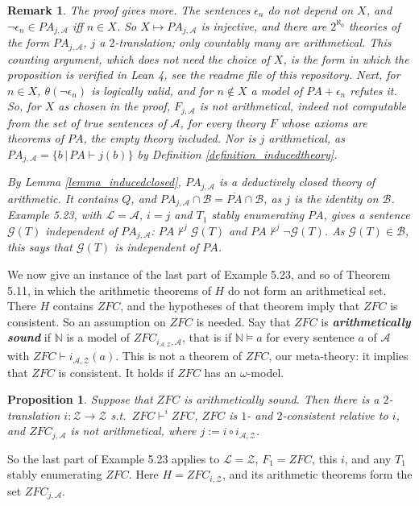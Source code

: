 \documentclass{amsart}  %
\numberwithin{equation}{section}
\newtheorem{proposition}[equation]{Proposition}
\newtheorem{remark}[equation]{Remark}
\theoremstyle{definition}
\theoremstyle{remark}
\begin{document}
\begin{remark} \label{remark_undefinable}
The proof gives more. The sentences $\epsilon _{n}$ do not depend on $X$, and $\neg \epsilon _{n} \in PA _{j, \mathcal{A}}$ iff $n \in X$. So $X \mapsto PA _{j, \mathcal{A}}$ is injective, and there are $2 ^{\aleph _{0}}$ theories of the form $PA _{j, \mathcal{A}}$, $j$ a $2$-translation; only countably many are arithmetical. This counting argument, which does not need the choice of $X$, is the form in which the proposition is verified in Lean 4, see the readme file of this repository. Next, for $n \in X$, $\theta (\neg \epsilon _{n})$ is logically valid, and for $n \notin X$ a model of $PA + \epsilon _{n}$ refutes it. So, for $X$ as chosen in the proof, $F _{j, \mathcal{A}}$ is not arithmetical, indeed not computable from the set of true sentences of $\mathcal{A}$, for every theory $F$ whose axioms are theorems of $PA$, the empty theory included. Nor is $j$ arithmetical, as $PA _{j, \mathcal{A}} = \{b \,|\, PA \vdash j (b)\}$ by Definition \ref{definition_inducedtheory}.

By Lemma \ref{lemma_inducedclosed}, $PA _{j, \mathcal{A}}$ is a deductively closed theory of arithmetic. It contains $Q$, and $PA _{j, \mathcal{A}} \cap \mathcal{B} = \overline{PA} \cap \mathcal{B}$, as $j$ is the identity on $\mathcal{B}$. Example 5.23, with $\mathcal{L} = \mathcal{A}$, $i = j$ and $T _{1}$ stably enumerating $PA$, gives a sentence $\mathcal{G} (T)$ independent of $PA _{j, \mathcal{A}}$: $PA \nvdash ^{j} \mathcal{G} (T)$ and $PA \nvdash ^{j} \neg \mathcal{G} (T)$. As $\mathcal{G} (T) \in \mathcal{B}$, this says that $\mathcal{G} (T)$ is independent of $PA$.
\end{remark}
We now give an instance of the last part of Example 5.23, and so of Theorem 5.11, in which the arithmetic theorems of $H$ do not form an arithmetical set. There $H$ contains $ZFC$, and the hypotheses of that theorem imply that $ZFC$ is consistent. So an assumption on $ZFC$ is needed. Say that $ZFC$ is \textbf{\emph{arithmetically sound}} if $\mathbb{N}$ is a model of $ZFC _{i _{\mathcal{A}, \mathcal{Z}}, \mathcal{A}}$, that is if $\mathbb{N} \models a$ for every sentence $a$ of $\mathcal{A}$ with $ZFC \vdash i _{\mathcal{A}, \mathcal{Z}} (a)$. This is not a theorem of $ZFC$, our meta-theory: it implies that $ZFC$ is consistent. It holds if $ZFC$ has an $\omega$-model.
\begin{proposition} \label{proposition_undefinableZFC}
Suppose that $ZFC$ is arithmetically sound. Then there is a $2$-translation $i: \mathcal{Z} \to \mathcal{Z}$ s.t.\ $ZFC \vdash ^{i} ZFC$, $ZFC$ is $1$- and $2$-consistent relative to $i$, and $ZFC _{j, \mathcal{A}}$ is not arithmetical, where $j := i \circ i _{\mathcal{A}, \mathcal{Z}}$.
\end{proposition}
So the last part of Example 5.23 applies to $\mathcal{L} = \mathcal{Z}$, $F _{1} = ZFC$, this $i$, and any $T _{1}$ stably enumerating $ZFC$. Here $H = ZFC _{i, \mathcal{Z}}$, and its arithmetic theorems form the set $ZFC _{j, \mathcal{A}}$.
\end{document}
